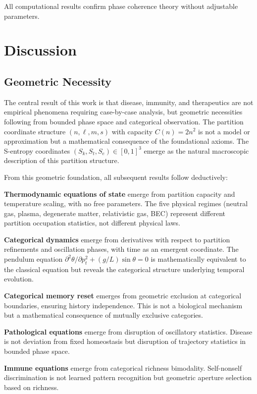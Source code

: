 \documentclass[11pt,twocolumn,a4paper]{article}
\theoremstyle{definition}
\theoremstyle{remark}
\newcommand{\Sk}{S_k}
\newcommand{\St}{S_t}
\newcommand{\Se}{S_e}
\begin{document}
All computational results confirm phase coherence theory without adjustable parameters.




\section{Discussion}
\label{sec:discussion}

\subsection{Geometric Necessity}

The central result of this work is that disease, immunity, and therapeutics are not empirical phenomena requiring case-by-case analysis, but geometric necessities following from bounded phase space and categorical observation. The partition coordinate structure $(n,\ell,m,s)$ with capacity $C(n) = 2n^2$ is not a model or approximation but a mathematical consequence of the foundational axioms. The S-entropy coordinates $(\Sk,\St,\Se) \in [0,1]^3$ emerge as the natural macroscopic description of this partition structure.

From this geometric foundation, all subsequent results follow deductively:

\textbf{Thermodynamic equations of state} emerge from partition capacity and temperature scaling, with no free parameters. The five physical regimes (neutral gas, plasma, degenerate matter, relativistic gas, BEC) represent different partition occupation statistics, not different physical laws.

\textbf{Categorical dynamics} emerge from derivatives with respect to partition refinements and oscillation phases, with time as an emergent coordinate. The pendulum equation $\partial^2\theta/\partial p_t^2 + (g/L)\sin\theta = 0$ is mathematically equivalent to the classical equation but reveals the categorical structure underlying temporal evolution.

\textbf{Categorical memory reset} emerges from geometric exclusion at categorical boundaries, ensuring history independence. This is not a biological mechanism but a mathematical consequence of mutually exclusive categories.

\textbf{Pathological equations} emerge from disruption of oscillatory statistics. Disease is not deviation from fixed homeostasis but disruption of trajectory statistics in bounded phase space.

\textbf{Immune equations} emerge from categorical richness bimodality. Self-nonself discrimination is not learned pattern recognition but geometric aperture selection based on richness.
\end{document}
